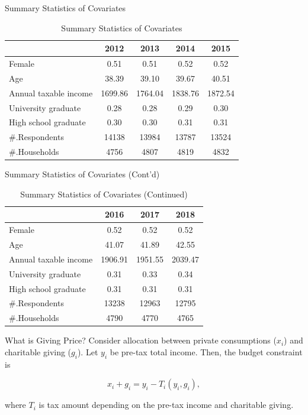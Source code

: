 \documentclass[
  ignorenonframetext,
]{beamer}
\begin{document}
\begin{frame}{Summary Statistics of Covariates}
\protect\hypertarget{summary-statistics-of-covariates}{}
\begin{table}

\caption{\label{tab:kableSummaryCovariate}Summary Statistics of Covariates}
\centering
\begin{tabular}[t]{lcccc}
\toprule
 & 2012 & 2013 & 2014 & 2015\\
\midrule
Female & 0.51 & 0.51 & 0.52 & 0.52\\
Age & 38.39 & 39.10 & 39.67 & 40.51\\
Annual taxable income & 1699.86 & 1764.04 & 1838.76 & 1872.54\\
University graduate & 0.28 & 0.28 & 0.29 & 0.30\\
High school graduate & 0.30 & 0.30 & 0.31 & 0.31\\
\#.Respondents & 14138 & 13984 & 13787 & 13524\\
\#.Households & 4756 & 4807 & 4819 & 4832\\
\bottomrule
\end{tabular}
\end{table}
\end{frame}

\begin{frame}{Summary Statistics of Covariates (Cont'd)}
\protect\hypertarget{summary-statistics-of-covariates-contd}{}
\begin{table}

\caption{\label{tab:kableSummaryCovariate2}Summary Statistics of Covariates (Continued)}
\centering
\begin{tabular}[t]{lccc}
\toprule
 & 2016 & 2017 & 2018\\
\midrule
Female & 0.52 & 0.52 & 0.52\\
Age & 41.07 & 41.89 & 42.55\\
Annual taxable income & 1906.91 & 1951.55 & 2039.47\\
University graduate & 0.31 & 0.33 & 0.34\\
High school graduate & 0.31 & 0.31 & 0.31\\
\#.Respondents & 13238 & 12963 & 12795\\
\#.Households & 4790 & 4770 & 4765\\
\bottomrule
\end{tabular}
\end{table}
\end{frame}

\begin{frame}{What is Giving Price?}
\protect\hypertarget{what-is-giving-price}{}
Consider allocation between private consumptions (\(x_i\)) and charitable giving (\(g_i\)).
Let \(y_i\) be pre-tax total income.
Then, the budget constraint is

\[
    x_i + g_i = y_i - T_i(y_i, g_i),
\]

where \(T_i\) is tax amount depending on the pre-tax income and charitable giving.
\end{frame}
\end{document}
